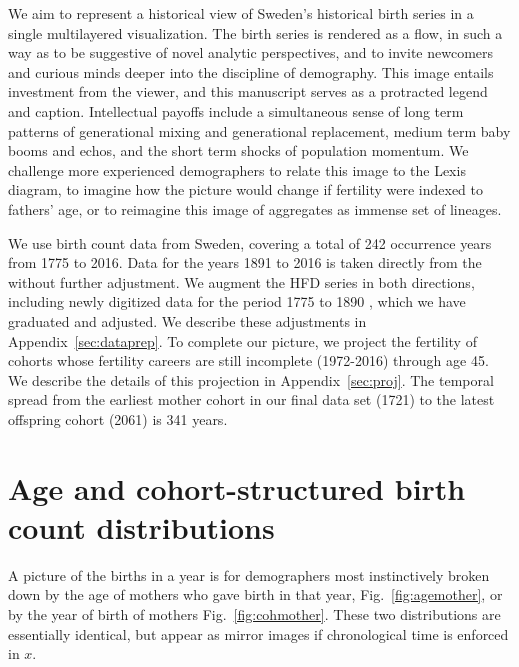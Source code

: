\documentclass{article}
\begin{document}
We aim to represent a historical view of Sweden's historical birth series in a single multilayered visualization. The birth series is rendered as a flow, in such a way as to be suggestive of novel analytic perspectives, and to invite newcomers and curious minds deeper into the discipline of demography. This image entails investment from the viewer, and this manuscript serves as a protracted legend and caption. Intellectual payoffs include a simultaneous sense of long term patterns of generational mixing and generational replacement, medium term baby booms and echos, and the short term shocks of population momentum. We challenge more experienced demographers to relate this image to the Lexis diagram, to imagine how the picture would change if fertility were indexed to fathers' age, or to reimagine this image of aggregates as immense set of lineages.

We use birth count data from Sweden, covering a total of 242 occurrence years from 1775 to 2016. Data for the years 1891 to 2016 is taken directly from the \citet{HFD} without further adjustment. We augment the HFD series in both directions, including newly digitized data for the period 1775 to 1890 \citep{sgf1907}, which we have graduated and adjusted. We describe these adjustments in Appendix~\ref{sec:dataprep}. To complete our picture, we project the fertility of cohorts whose fertility careers are still incomplete (1972-2016) through age 45. We describe the details of this projection in Appendix~\ref{sec:proj}. The temporal spread from the earliest mother cohort in our final data set (1721) to the latest offspring cohort (2061) is 341 years.

\section{Age and cohort-structured birth count distributions}
A picture of the births in a year is for demographers most instinctively broken down by the age of mothers who gave birth in that year, Fig.~\ref{fig:agemother}, or by the year of birth of mothers Fig.~\ref{fig:cohmother}. These two distributions are essentially identical, but appear as mirror images if chronological time is enforced in $x$.
\end{document}
